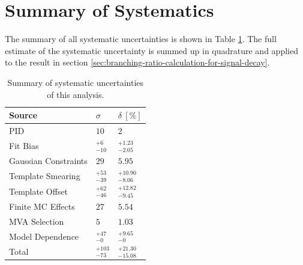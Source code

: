 \section{Summary of Systematics}

The summary of all systematic uncertainties is shown in Table \ref{tab:sys_summary}. The full estimate of the systematic uncertainty is summed up in quadrature and applied to the result in section \ref{sec:branching-ratio-calculation-for-signal-decay}.


\begin{table}[H]
	\centering
	\begin{tabular}{|l|l|l|}
		\hline
		Source & $\sigma$ & $\delta~[\%]$ \\
		\hline
		\hline
		PID & $10$ & $2$ \\
		\hline
		Fit Bias & $ {}^{+6}_{-10}$ & ${}^{+1.23}_{-2.05}$ \\
		\hline
		Gaussian Constraints & $29$ & $5.95$ \\
		\hline
		Template Smearing & ${}^{+53}_{-39}$ & ${}^{+10.90}_{-8.06}$ \\
		\hline
		Template Offset & ${}^{+62}_{-46}$ & ${}^{+12.82}_{-9.45}$ \\
		\hline
		Finite MC Effects & $27$ & $5.54$ \\
		\hline
		MVA Selection & $5$ & $1.03$\\
		\hline
		Model Dependence & ${}^{+47}_{-0}$ & ${}^{+9.65}_{-0}$ \\
		\hline
		\hline
		Total & ${} ^{+103}_{-73}$ & ${}^{+21.30}_{-15.08}$ \\
		\hline
	\end{tabular}
	\caption{Summary of systematic uncertainties of this analysis.}
	\label{tab:sys_summary}
\end{table}







